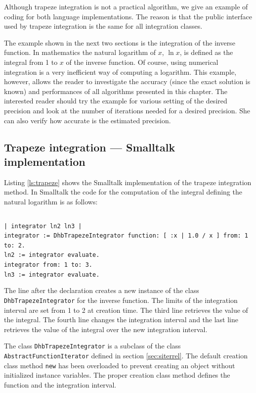 \documentclass[twoside]{book}
\begin{document}
Although trapeze integration is not a practical algorithm, we give
an example of coding for both language implementations. The reason
is that the public interface used by trapeze integration is the
same for all integration classes.

The example shown in the next two sections is the integration of
the inverse function. In mathematics the natural logarithm of $x$,
$\ln x$, is defined as the integral from 1 to $x$ of the inverse
function. Of course, using numerical integration is a very
inefficient way of computing a logarithm. This example, however,
allows the reader to investigate the accuracy (since the exact
solution is known) and performances of all algorithms presented in
this chapter. The interested reader should try the example for
various setting of the desired precision and look at the number of
iterations needed for a desired precision. She can also verify how
accurate is the estimated precision.

\subsection{Trapeze integration --- Smalltalk implementation}
\label{sec:strapeze} Listing \ref{ls:trapeze} shows the Smalltalk
implementation of the trapeze integration method. In Smalltalk the
code for the computation of the integral defining the natural
logarithm is as follows:
\begin{codeExample}
\begin{verbatim}

\end{verbatim}
{\tt | integrator ln2 ln3 |}\\ {\tt integrator :=
DhbTrapezeIntegrator function: [ :x | 1.0 / x ] from: 1 to: 2.}\\
{\tt ln2 := integrator evaluate.}\\ {\tt integrator from: 1 to:
3.}\\ {\tt ln3 := integrator evaluate.}\\
\end{codeExample}
The line after the declaration creates a new instance of the class
{\tt DhbTrapezeIntegrator} for the inverse function. The limits of
the integration interval are set from 1 to 2 at creation time. The
third line retrieves the value of the integral. The fourth line
changes the integration interval and the last line retrieves the
value of the integral over the new integration interval.

The class {\tt DhbTrapezeIntegrator} is a subclass of the class
{\tt AbstractFunctionIterator} defined in section
\ref{sec:siterrel}. The default creation class method {\tt new}
has been overloaded to prevent creating an object without
initialized instance variables. The proper creation class method
defines the function and the integration interval.
\end{document}
